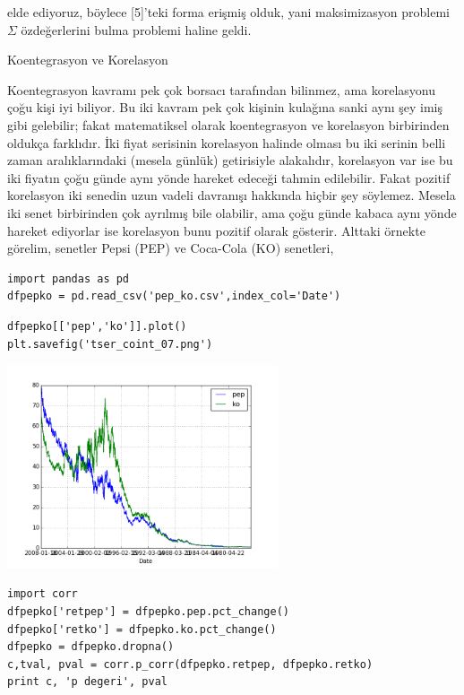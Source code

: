 \documentclass[12pt,fleqn]{article}\usepackage{../../common}
\begin{document}
elde ediyoruz, böylece [5]'teki forma erişmiş olduk, yani maksimizasyon
problemi $\Sigma$ özdeğerlerini bulma problemi haline geldi.


Koentegrasyon ve Korelasyon

Koentegrasyon kavramı pek çok borsacı tarafından bilinmez, ama korelasyonu
çoğu kişi iyi biliyor. Bu iki kavram pek çok kişinin kulağına sanki aynı
şey imiş gibi gelebilir; fakat matematiksel olarak koentegrasyon ve
korelasyon birbirinden oldukça farklıdır. İki fiyat serisinin korelasyon
halinde olması bu iki serinin belli zaman aralıklarındaki (mesela günlük)
getirisiyle alakalıdır, korelasyon var ise bu iki fiyatın çoğu günde aynı
yönde hareket edeceği tahmin edilebilir. Fakat pozitif korelasyon iki
senedin uzun vadeli davranışı hakkında hiçbir şey söylemez. Mesela iki
senet birbirinden çok ayrılmış bile olabilir, ama çoğu günde kabaca aynı
yönde hareket ediyorlar ise korelasyon bunu pozitif olarak
gösterir. Alttaki örnekte görelim, senetler Pepsi (PEP) ve Coca-Cola (KO) 
senetleri,

\begin{verbatim}
import pandas as pd
dfpepko = pd.read_csv('pep_ko.csv',index_col='Date')
\end{verbatim}

\begin{verbatim}
dfpepko[['pep','ko']].plot()
plt.savefig('tser_coint_07.png')
\end{verbatim}

\includegraphics[height=6cm]{tser_coint_07.png}

\begin{verbatim}
import corr
dfpepko['retpep'] = dfpepko.pep.pct_change()
dfpepko['retko'] = dfpepko.ko.pct_change()
dfpepko = dfpepko.dropna()
c,tval, pval = corr.p_corr(dfpepko.retpep, dfpepko.retko)
print c, 'p degeri', pval
\end{verbatim}
\end{document}
